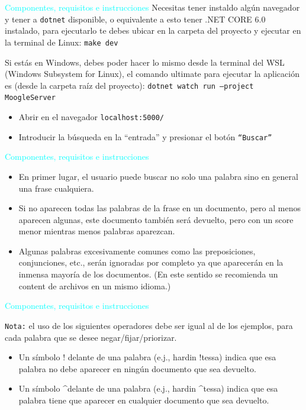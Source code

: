 \documentclass[a4paper, 12pt]{beamer}
\begin{document}
\begin{frame}{\textcolor{cyan}{Componentes, requisitos e instrucciones}}
    Necesitas tener instaldo algún navegador y tener a {\tt dotnet} disponible, o equivalente a esto tener .NET CORE 6.0 instalado, para 
    ejecutarlo te debes ubicar en la carpeta del proyecto y ejecutar en la terminal de Linux:
     {\tt make dev}
    
     Si estás en Windows, debes poder hacer lo mismo desde la terminal del WSL (Windows Subsystem for Linux), el comando ultimate para ejecutar la aplicación es (desde la carpeta raíz del proyecto):
    {\tt dotnet watch run --project MoogleServer}
    \begin{itemize}
        \item Abrir en el navegador {\tt localhost:5000/}
        \item Introducir la b\'usqueda en la ``entrada'' y presionar el bot\'on {\tt ``Buscar''}
    \end{itemize}
\end{frame}

\begin{frame}{\textcolor{cyan}{Componentes, requisitos e instrucciones}}
    \begin{itemize}
        \item {\small En primer lugar, el usuario puede buscar no solo una palabra sino en general una frase cualquiera.}
        \item {\small Si no aparecen todas las palabras de la frase en un documento, pero al menos aparecen algunas, este documento también será devuelto, pero con un score menor mientras menos palabras aparezcan.}
        \item {\small Algunas palabras excesivamente comunes como las preposiciones, conjunciones, etc., serán ignoradas por completo ya que aparecerán en la inmensa mayoría de los documentos. (En este sentido se recomienda un content de archivos en un mismo idioma.)}
    \end{itemize}
\end{frame}

\begin{frame}{\textcolor{cyan}{Componentes, requisitos e instrucciones}}
    
    {\tt Nota:} el uso de los siguientes operadores debe ser igual al de los ejemplos, para cada palabra que se desee negar/fijar/priorizar.
    \begin{itemize}
        \item {\small Un símbolo $!$ delante de una palabra (e.j., hardin $!$tessa) indica que esa palabra no debe aparecer en ningún documento que sea devuelto.}
        \item {\small Un símbolo \textasciicircum delante de una palabra (e.j., hardin \textasciicircum tessa) indica que esa palabra tiene que aparecer en cualquier documento que sea devuelto.}
    \end{itemize}
\end{frame}
\end{document}
